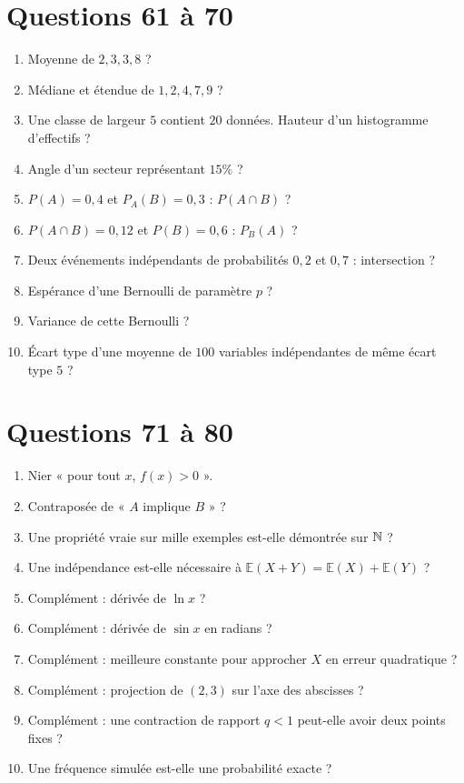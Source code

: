 \documentclass[11pt,a4paper,oneside]{book}
\begin{document}
\section{Questions 61 à 70}
\begin{enumerate}[start=61]
\item Moyenne de $2,3,3,8$ ?
\item Médiane et étendue de $1,2,4,7,9$ ?
\item Une classe de largeur $5$ contient $20$ données. Hauteur d'un histogramme d'effectifs ?
\item Angle d'un secteur représentant $15\%$ ?
\item $P(A)=0{,}4$ et $P_A(B)=0{,}3$ : $P(A\cap B)$ ?
\item $P(A\cap B)=0{,}12$ et $P(B)=0{,}6$ : $P_B(A)$ ?
\item Deux événements indépendants de probabilités $0{,}2$ et $0{,}7$ : intersection ?
\item Espérance d'une Bernoulli de paramètre $p$ ?
\item Variance de cette Bernoulli ?
\item Écart type d'une moyenne de $100$ variables indépendantes de même écart type $5$ ?
\end{enumerate}
\section{Questions 71 à 80}
\begin{enumerate}[start=71]
\item Nier « pour tout $x$, $f(x)>0$ ».
\item Contraposée de « $A$ implique $B$ » ?
\item Une propriété vraie sur mille exemples est-elle démontrée sur $\mathbb{N}$ ?
\item Une indépendance est-elle nécessaire à $\mathbb E(X+Y)=\mathbb E(X)+\mathbb E(Y)$ ?
\item Complément : dérivée de $\ln x$ ?
\item Complément : dérivée de $\sin x$ en radians ?
\item Complément : meilleure constante pour approcher $X$ en erreur quadratique ?
\item Complément : projection de $(2,3)$ sur l'axe des abscisses ?
\item Complément : une contraction de rapport $q<1$ peut-elle avoir deux points fixes ?
\item Une fréquence simulée est-elle une probabilité exacte ?
\end{enumerate}
\end{document}
